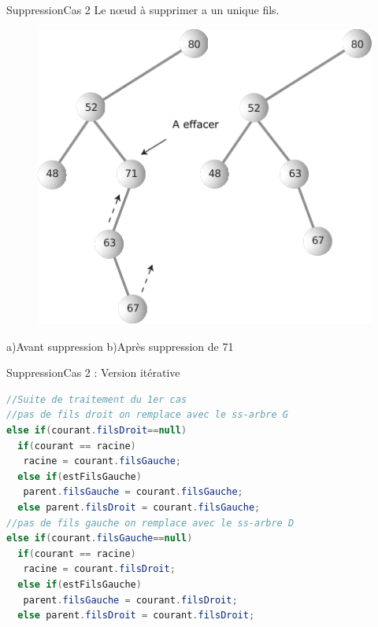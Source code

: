 \documentclass[12pt,a4paper]{beamer}
\begin{document}
\begin{frame}{Suppression}{Cas 2}
Le n\oe ud à supprimer a un unique fils.
\begin{figure}
\includegraphics[scale=0.8]{figs/del2_tree}
\end{figure}
\hspace{3em}a)Avant suppression  \hspace{1em}  b)Après suppression de 71
\end{frame}

\begin{frame}[fragile]{Suppression}{Cas 2 : Version itérative}
\begin{lstlisting}[language=Java]
//Suite de traitement du 1er cas
//pas de fils droit on remplace avec le ss-arbre G
else if(courant.filsDroit==null)
  if(courant == racine)
   racine = courant.filsGauche;
  else if(estFilsGauche)
   parent.filsGauche = courant.filsGauche;
  else parent.filsDroit = courant.filsGauche;
//pas de fils gauche on remplace avec le ss-arbre D
else if(courant.filsGauche==null)
  if(courant == racine)
   racine = courant.filsDroit;
  else if(estFilsGauche)
   parent.filsGauche = courant.filsDroit;
  else parent.filsDroit = courant.filsDroit;
\end{lstlisting}
\end{frame}
\end{document}

